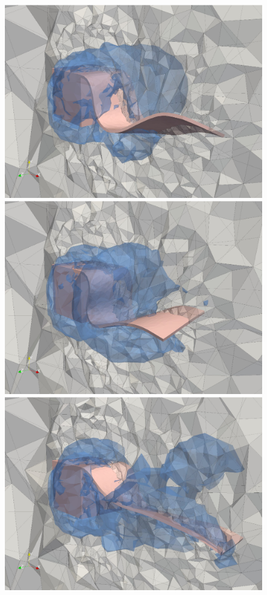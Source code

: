 \begin{figure}
  \includegraphics[width=\twofigs]{chapters/hoffman-1/png/cube168.png}\\
  \includegraphics[width=\twofigs]{chapters/hoffman-1/png/cube187.png}
  \includegraphics[width=\twofigs]{chapters/hoffman-1/png/cube405.png}\\

\end{figure}
